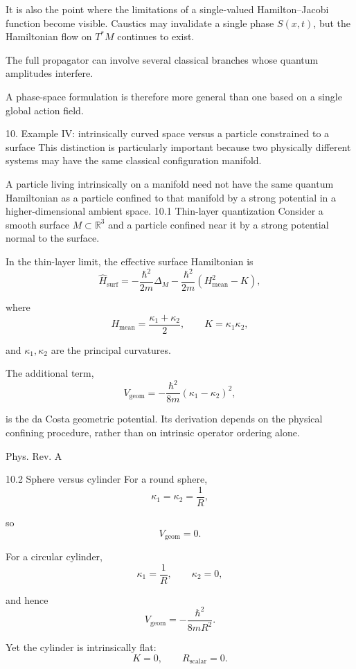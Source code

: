 It is also the point where the limitations of a single-valued Hamilton–Jacobi function become visible. Caustics may invalidate a single phase \(S(x,t)\), but the Hamiltonian flow on \(T^*M\) continues to exist.

The full propagator can involve several classical branches whose quantum amplitudes interfere.

A phase-space formulation is therefore more general than one based on a single global action field.

10. Example IV: intrinsically curved space versus a particle constrained to a surface
This distinction is particularly important because two physically different systems may have the same classical configuration manifold.

A particle living intrinsically on a manifold need not have the same quantum Hamiltonian as a particle confined to that manifold by a strong potential in a higher-dimensional ambient space.
10.1 Thin-layer quantization
Consider a smooth surface \(M\subset\mathbb R^3\) and a particle confined near it by a strong potential normal to the surface.

In the thin-layer limit, the effective surface Hamiltonian is
\[
\boxed{
\widehat H_{\mathrm{surf}}
=
-\frac{\hbar^2}{2m}\Delta_M
-
\frac{\hbar^2}{2m}
(H_{\mathrm{mean}}^2-K),
}
\tag{91}
\]

where
\[
H_{\mathrm{mean}}=\frac{\kappa_1+\kappa_2}{2},
\qquad
K=\kappa_1\kappa_2,
\]

and \(\kappa_1,\kappa_2\) are the principal curvatures.

The additional term,
\[
\boxed{
V_{\mathrm{geom}}
=
-\frac{\hbar^2}{8m}(\kappa_1-\kappa_2)^2,
}
\tag{92}
\]

is the da Costa geometric potential. Its derivation depends on the physical confining procedure, rather than on intrinsic operator ordering alone. 

Phys. Rev. A



10.2 Sphere versus cylinder
For a round sphere,
\[
\kappa_1=\kappa_2=\frac1R,
\]

so
\[
V_{\mathrm{geom}}=0.
\]

For a circular cylinder,
\[
\kappa_1=\frac1R,\qquad \kappa_2=0,
\]

and hence
\[
\boxed{
V_{\mathrm{geom}}=-\frac{\hbar^2}{8mR^2}.
}
\tag{93}
\]

Yet the cylinder is intrinsically flat:
\[
K=0,\qquad R_{\mathrm{scalar}}=0.
\]

